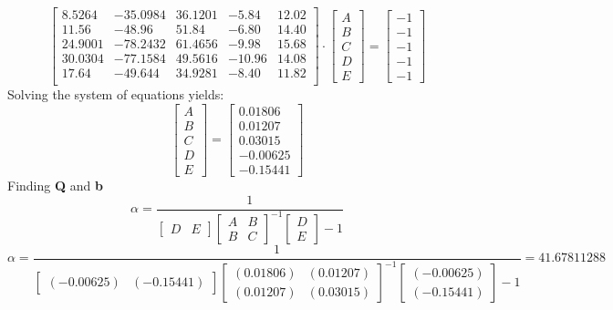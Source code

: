 \begin{enumerate}[a.)]
\[
\begin{bmatrix}
8.5264 & -35.0984 & 36.1201 & -5.84 & 12.02 \\
11.56 & -48.96 & 51.84 & -6.80 & 14.40 \\
24.9001 & -78.2432 & 61.4656 & -9.98 & 15.68 \\
30.0304 & -77.1584 & 49.5616 & -10.96 & 14.08 \\
17.64 & -49.644 & 34.9281 & -8.40 & 11.82 \\
\end{bmatrix} \cdot
\begin{bmatrix}
A \\ B \\ C \\ D \\ E
\end{bmatrix}
=
\begin{bmatrix}
-1 \\ -1 \\ -1 \\ -1 \\ -1
\end{bmatrix}
\]
Solving the system of equations yields:
\[
    \begin{bmatrix}
        A \\
        B \\
        C \\
        D \\
        E
        \end{bmatrix} = \begin{bmatrix}
        0.01806 \\
        0.01207 \\
        0.03015 \\
        -0.00625 \\
        -0.15441
        \end{bmatrix}
\]
Finding \textbf{Q} and \textbf{b}
\[
    \alpha = \frac{1}{\begin{bmatrix} D & E \end{bmatrix} \begin{bmatrix} A & B \\ B & C \end{bmatrix}^{-1} \begin{bmatrix} D \\ E \end{bmatrix} - 1}
\]
\[
    \alpha = \frac{1}{\begin{bmatrix} (-0.00625) & (-0.15441) \end{bmatrix} \begin{bmatrix} (0.01806) & (0.01207) \\ (0.01207) & (0.03015) \end{bmatrix}^{-1} \begin{bmatrix} (-0.00625) \\ (-0.15441) \end{bmatrix} - 1} = 41.67811288
\]


\end{enumerate}
